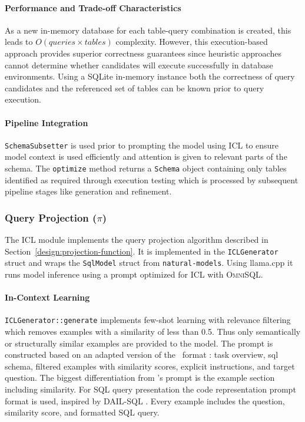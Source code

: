 \paragraph{Performance and Trade-off Characteristics}

As a new in-memory database for each table-query combination is created, this
leads to $O(queries \times tables)$ complexity. However, this execution-based
approach provides superior correctness guarantees since heuristic approaches
cannot determine whether candidates will execute successfully in database
environments. Using a SQLite in-memory instance both the correctness of query
candidates and the referenced set of tables can be known prior to query
execution.

\paragraph{Pipeline Integration}

\texttt{SchemaSubsetter} is used prior to prompting the model using ICL to
ensure model context is used efficiently and attention is given to
relevant parts of the schema. The \texttt{optimize} method returns a
\texttt{Schema} object containing only tables identified as required through
execution testing which is processed by subsequent pipeline stages
like generation and refinement.

\subsubsection{Query Projection ($\pi$)}

The ICL module implements the query projection algorithm described in
Section~\ref{design:projection-function}. It is implemented in the
\texttt{ICLGenerator} struct and wraps the \texttt{SqlModel} struct from
\texttt{natural-models}. Using llama.cpp it runs model inference using a
prompt optimized for ICL with \textsc{OmniSQL}.

\paragraph{In-Context Learning}

\texttt{ICLGenerator::generate} implements few-shot learning with relevance
filtering which removes examples with a similarity of less than 0.5. Thus only
semantically or structurally similar examples are provided to the model. The
prompt is constructed based on an adapted version of the \OmniSQL~format
\citep{OmniSQL}: task overview, sql schema, filtered examples with similarity
scores, explicit instructions, and target question. The biggest differentiation
from \citeauthor{OmniSQL}'s prompt is the example section including similarity.
For SQL query presentation the code representation prompt format is used,
inspired by DAIL-SQL \citep{DAIL-SQL}. Every example includes the question,
similarity score, and formatted SQL query.


